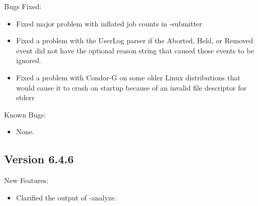 \noindent Bugs Fixed:
\begin{itemize}

\item Fixed major problem with inflated job counts in  -submitter 
\item Fixed a problem with the UserLog parser if the Aborted, Held, or Removed
event did not have the optional reason string that caused those events to be
ignored.

\item Fixed a problem with Condor-G on some older Linux distributions that
would cause it to crash on startup because of an invalid file descriptor for
stderr

\end{itemize}
\noindent Known Bugs:
\begin{itemize}

\item None.

\end{itemize}

\subsection{\label{sec:New-6-4-6}Version 6.4.6}

\noindent New Features:
\begin{itemize}

\item Clarified the output of  -analyze.

\end{itemize}


